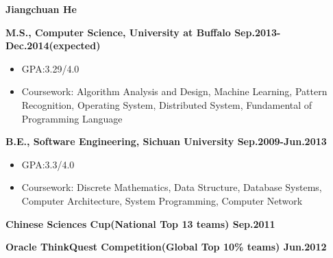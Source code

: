 \documentclass{myres}
\begin{document}
{\LARGE \bf Jiangchuan He}
\myline

{

}

{\textbf{M.S., Computer Science, University at Buffalo \hfill Sep.2013-Dec.2014(expected)} 		
\begin{itemize}[topsep=0pt, leftmargin=0.2in] \itemsep -5pt
	\item[]GPA:3.29/4.0
	\item[]Coursework: Algorithm Analysis and Design, Machine Learning, Pattern Recognition, Operating System, Distributed System,
		Fundamental of Programming Language
\end{itemize}
\par
\smallskip
\textbf{B.E., Software Engineering, Sichuan University \hfill Sep.2009-Jun.2013} 		
\begin{itemize}[topsep=0pt, leftmargin=0.2in] \itemsep -5pt
	\item[]GPA:3.3/4.0
	\item[]Coursework: Discrete Mathematics, Data Structure, Database Systems, Computer Architecture, System Programming,
		Computer Network
\end{itemize}

}
{
 	\textbf{Chinese Sciences Cup(National Top 13 teams) \hfill Sep.2011}
	\par
	\textbf{Oracle ThinkQuest Competition(Global Top 10\% teams) \hfill  Jun.2012}
}
\end{document}
